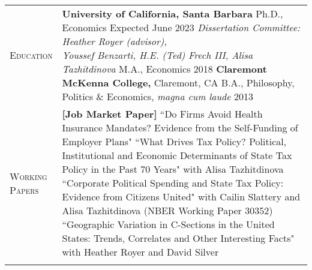 \documentclass[11pt]{article}
\begin{document}
\begin{tabularx}{\textwidth}{@{}Y Z@{}}
	
	\textsc{Education} &
	\textbf{University of California, Santa Barbara}
	\vspace{3pt} \newline
	\hspace*{15pt} Ph.D., Economics \hfill Expected June 2023
	\vspace{3pt} \newline
	\hspace*{15pt} \textit{Dissertation Committee: Heather Royer (advisor), \newline \hspace*{15pt} Youssef Benzarti, H.E. (Ted) Frech III, Alisa Tazhitdinova} 
	\vspace{10pt} \newline
	\hspace*{15pt} M.A., Economics \hfill 2018
	\vspace{15pt} \newline
	\textbf{Claremont McKenna College,} Claremont, CA 
	\vspace{3pt} \newline
	\hspace*{15pt} B.A., Philosophy, Politics \& Economics, \textit{magna cum laude} \hfill 2013 
	\vspace{0pt}
   \\  \addlinespace[20pt] 

	\textsc{Working \newline Papers} & 
	 \textbf{[Job Market Paper]} ``Do Firms Avoid Health Insurance Mandates? \newline Evidence from the Self-Funding of Employer Plans"
	\vspace{12pt} \newline
	``What Drives Tax Policy? Political, Institutional and Economic Determinants \newline of State Tax Policy in the Past 70 Years" with Alisa Tazhitdinova 
	\vspace{12pt} \newline
	``Corporate Political Spending and State Tax Policy: Evidence from Citizens United" \newline with Cailin Slattery and Alisa Tazhitdinova (NBER Working Paper 30352)
	\vspace{12pt} \newline
	``Geographic Variation in C-Sections in the United States: Trends, Correlates \newline and Other Interesting Facts" with Heather Royer and David Silver 
     \\ \addlinespace[20pt] 
    

\end{tabularx}
\end{document}
